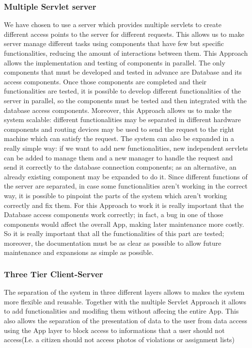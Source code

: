 \subsubsection{Multiple Servlet server}
We have chosen to use a server which provides multiple servlets to create different access points to the server for different requests. This allows us to make server manage different tasks using components that have few but specific functionalities, reducing the amount of interactions between them.
This Approach allows the implementation and testing of components in parallel. The only components that must be developed and tested in advance are Database and its access components.
 Once those components are completed and their functionalities are tested, it is possible to develop different functionalities of the server in parallel, so the components must be tested and then integrated with the database access components. Moreover, this Approach allows us to make the system scalable: different functionalities may be separated in different hardware components and  routing devices may be used to send the request to the right machine which can satisfy the request.
 The system can also be expanded in a really simple way: if we want to add new functionalities, new independent servlets can be added to manage them and a new manager to handle the request and send it correctly to the database connection components; as an alternative, an already existing component may be expanded to do it. Since different functions of the server are separated, in case some functionalities aren’t working in the correct way, it is possible to pinpoint the parts of the system which aren’t working correctly and fix them. For this Approach to work it is really important that the Database access components work correctly; in fact, a bug in one of those components would affect the overall App, making later maintenance more costly. So it is really important that all the functionalities of this part are tested; moreover, the documentation must be as clear as possible to allow future maintenance and expansions as simple as possible.
\subsubsection{Three Tier Client-Server}

The separation of the system in three different layers allows to makes the system more flexible and reusable.
Together with the multiple Servlet Approach it allows to add functionalities and modifing them without affecing the entire App.
This also allows the separation of the presentation of data to the user from data access using the App layer to block access to informations that a user should not access(I.e. a citizen should not access photos of violations or assignment lists)

